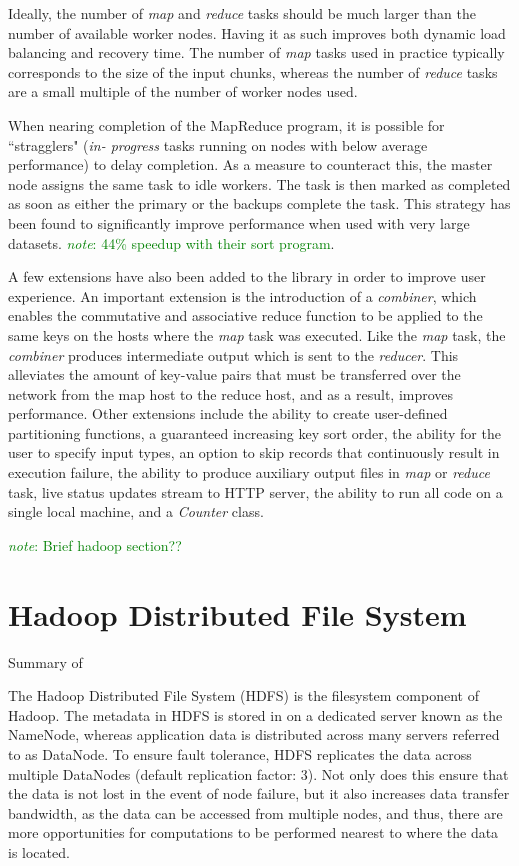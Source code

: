 \documentclass{report}
\newcommand{\note}[1]{\textcolor{green}{\textit{note}: #1}}
\begin{document}
Ideally, the number of \textit{map} and \textit{reduce} tasks should be much larger than the number 
of available worker nodes. Having it as such improves both dynamic load balancing and recovery 
time. The number of \textit{map} tasks used in practice typically corresponds to the 
size of the input chunks, whereas the number of \textit{reduce} tasks are a small multiple of the 
number of worker nodes used.

When nearing completion of the MapReduce program, it is possible for  ``stragglers" (\textit{in-
progress} tasks running on nodes with below average performance) to delay completion. As a 
measure to counteract this, the master node assigns the same task to idle workers. The task is 
then marked as completed as soon as either the primary or the backups complete the task. 
This strategy has been found to significantly improve performance when used with very large 
datasets. \note{44\% speedup with their sort program}.

A few extensions have also been added to the library in order to improve user experience. An 
important extension is the introduction of a \textit{combiner}, which enables the commutative and 
associative reduce function to be applied to the same keys on the hosts where the \textit{map} task 
was executed. Like the \textit{map} task, the \textit{combiner} produces intermediate output which 
is sent to the \textit{reducer}. This alleviates the amount of key-value pairs that must be transferred 
over the network from the map host to the reduce host, and as a result, improves performance. 
Other extensions include the ability to create user-defined partitioning functions, a guaranteed 
increasing key sort order, the ability for the user to specify input types, an option to skip records 
that continuously result in execution failure, the ability to produce auxiliary output files in 
\textit{map} or \textit{reduce} task, live status updates stream to HTTP server,  the ability to run all 
code on a single local machine, and a \textit{Counter} class.

\note{Brief hadoop section??}

\section{Hadoop Distributed File System}
Summary of \cite{hadoop}

The Hadoop Distributed File System (HDFS) is the filesystem component of Hadoop. The 
metadata in HDFS is stored in on a dedicated server known as the NameNode, whereas 
application data is distributed across many servers referred to as DataNode. To ensure fault 
tolerance, HDFS replicates the data across multiple DataNodes (default replication factor: 
3). Not only does this ensure that the data is not lost in the event of node failure, but it also increases data transfer bandwidth, as the data can be accessed from multiple nodes, and thus, there are more opportunities for computations to be performed nearest to where the data is located. 
\end{document}
